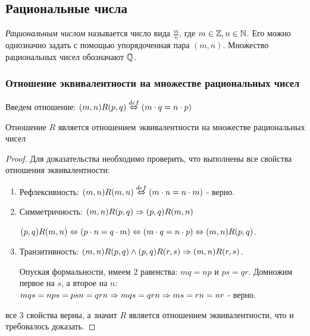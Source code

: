 \subsection{Рациональные числа}

\begin{definition}
    \textit{Рациональным числом} называется число вида
    $\frac{m}{n}$, где $m \in \mathbb{Z}, n \in \mathbb{N}$. Его можно
    однозначно задать с помощью упорядоченная пара $(m, n)$.
    Множество рациональных чисел обозначают $\mathbb{Q}$.
\end{definition}

\subsubsection*{Отношение эквивалентности на
множестве рациональных чисел}

\begin{definition}
    Введем отношение: $(m, n)R(p, q) \overset{def}{\Leftrightarrow}
    (m \cdot q = n \cdot p)$
\end{definition}

\begin{proposition}
    Отношение $R$ является отношением эквивалентности
    на множестве рациональных чисел
\end{proposition}

\begin{proof}
    Для доказательства необходимо проверить, что
    выполнены все свойства отношения эквивалентности:
    \begin{enumerate}
        \item Рефлексивность: $(m, n)R(m, n) \overset{def}{\Leftrightarrow}
            (m \cdot n = n \cdot m)$ - верно.
        \item Симметричность: $(m, n)R(p, q) \Rightarrow
            (p, q)R(m, n)$
            
            $(p, q)R(m, n) \Leftrightarrow
            (p \cdot n = q \cdot m) \Leftrightarrow (m \cdot q = n \cdot p)
            \Leftrightarrow (m, n)R(p, q)$.
        \item Транзитивность: 
        $(m, n)R(p, q) \wedge (p, q)R(r, s) \Rightarrow (m, n)R(r, s)$.
        
        Опуская формальности, имеем $2$ равенства: $mq = np$ и $ps = qr$.
        Домножим первое на $s$, а второе на
        $n$: $mqs = nps = psn = qrn \Rightarrow mqs =
        qrn \Rightarrow ms = rn = nr$ - верно.
    \end{enumerate}
    все $3$ свойства верны, а значит $R$ является
    отношением эквивалентности, что и требовалось доказать.
\end{proof}

